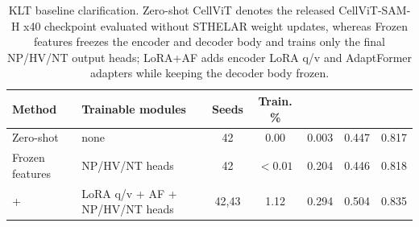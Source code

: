 \begin{table}
\caption{KLT baseline clarification. Zero-shot CellViT denotes the released CellViT-SAM-H x40 checkpoint evaluated without STHELAR weight updates, whereas Frozen features freezes the encoder and decoder body and trains only the final NP/HV/NT output heads; LoRA+AF adds encoder LoRA q/v and AdaptFormer adapters while keeping the decoder body frozen.}
\label{tab:klt-fair-baselines}
\centering
\footnotesize
\setlength{\tabcolsep}{3pt}
\begin{tabular}{llccccc}
\toprule
Method & Trainable modules & Seeds & Train. \% & \mPQ{} & \bPQ{} & \Fdet{} \\
\midrule
Zero-shot \CellViT{} & none & 42 & 0.00 & 0.003 & 0.447 & 0.817 \\
Frozen features & NP/HV/NT heads & 42 & $<0.01$ & 0.204 & 0.446 & 0.818 \\
\LoRA{}+\AF{} & LoRA q/v + AF + NP/HV/NT heads & 42,43 & 1.12 & 0.294 & 0.504 & 0.835 \\
\bottomrule
\end{tabular}
\end{table}
